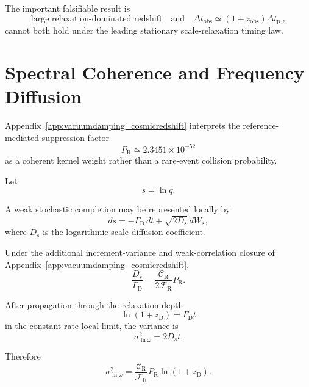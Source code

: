 The important falsifiable result is
\begin{equation}
    \boxed{
    \text{large relaxation-dominated redshift}
    \quad\text{and}\quad
    \Delta t_{\mathrm{obs}}
    \simeq
    (1+z_{\mathrm{obs}})
    \Delta t_{\mathrm{p,e}}
    }
\end{equation}
cannot both hold under the leading stationary scale-relaxation timing law.


\section{Spectral Coherence and Frequency Diffusion}

Appendix~\ref{app:vacuumdamping_cosmicredshift} interprets the
reference-mediated suppression factor
\begin{equation}
    P_{\mathrm R}
    \simeq
    2.3451\times10^{-52}
\end{equation}
as a coherent kernel weight rather than a rare-event collision probability.

Let
\begin{equation}
    s
    =
    \ln q.
\end{equation}

A weak stochastic completion may be represented locally by
\begin{equation}
    ds
    =
    -\Gamma_{\mathrm D}\,dt
    +
    \sqrt{2D_s}\,dW_s,
    \label{eq:AR_scale_SDE}
\end{equation}
where \(D_s\) is the logarithmic-scale diffusion coefficient.

Under the additional increment-variance and weak-correlation closure of
Appendix~\ref{app:vacuumdamping_cosmicredshift},
\begin{equation}
    \boxed{
    \frac{
        D_s
    }{
        \Gamma_{\mathrm D}
    }
    =
    \frac{
        \mathcal C_{\mathrm R}
    }{
        2\mathcal F_{\mathrm R}
    }
    P_{\mathrm R}.
    }
    \label{eq:AR_Ds_ratio}
\end{equation}

After propagation through the relaxation depth
\begin{equation}
    \ln(1+z_{\mathrm D})
    =
    \Gamma_{\mathrm D}t
\end{equation}
in the constant-rate local limit, the variance is
\begin{equation}
    \sigma_{\ln\omega}^{2}
    =
    2D_st.
\end{equation}

Therefore
\begin{equation}
    \boxed{
    \sigma_{\ln\omega}^{2}
    =
    \frac{
        \mathcal C_{\mathrm R}
    }{
        \mathcal F_{\mathrm R}
    }
    P_{\mathrm R}
    \ln(1+z_{\mathrm D}).
    }
    \label{eq:AR_line_variance}
\end{equation}

